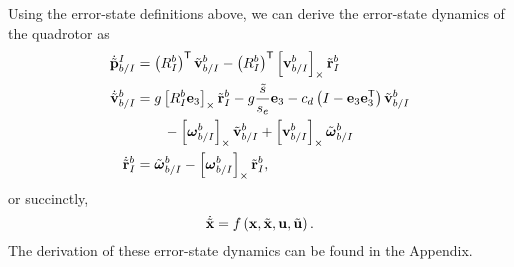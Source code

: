 Using the error-state definitions above, we can derive the error-state dynamics
of the quadrotor as
\begin{align}
        \dot{\tilde{\boldsymbol{\mathrm{p}}}}_{b/I}^{I} &= \left(R_{I}^{b}\right)^{\mathsf{T}}
          \tilde{\boldsymbol{\mathrm{v}}}_{b/I}^{b} - \left(R_{I}^{b}\right)^{\mathsf{T}}
          \left[ \boldsymbol{\mathrm{v}}_{b/I}^{b} \right]_{\times} \tilde{\boldsymbol{\mathrm{r}}}_I^b \nonumber\\
        \dot{\tilde{\boldsymbol{\mathrm{v}}}}_{b/I}^{b} &= g\left[ R_I^b
          \boldsymbol{\mathrm{e}}_3 \right]_{\times} \tilde{\boldsymbol{\mathrm{r}}}_I^b -g\frac{\tilde{s}}{s_e}\boldsymbol{\mathrm{e}}_3
          -c_d \left( I - \boldsymbol{\mathrm{e}}_3 \boldsymbol{\mathrm{e}}_3^{\mathsf{T}} \right)
          \tilde{\boldsymbol{\mathrm{v}}}_{b/I}^b \nonumber \\
                                         & \qquad - \left[ \boldsymbol{\mathrm{\omega}}_{b/I}^b \right]_{\times}
          \tilde{\boldsymbol{\mathrm{v}}}_{b/I}^b + \left[ \boldsymbol{\mathrm{v}}_{b/I}^b \right]_{\times}
          \tilde{\boldsymbol{\mathrm{\omega}}}_{b/I}^b \nonumber \\
          \dot{\tilde{\boldsymbol{\mathrm{r}}}}_{I}^{b} &= \tilde{\boldsymbol{\mathrm{\omega}}}_{b/I}^{b} -
        \left[ \boldsymbol{\mathrm{\omega}}_{b/I}^{b}  \right]_{\times} \tilde{\boldsymbol{\mathrm{r}}}_I^b,
	\label{eq:error_state_dynamics}
\end{align}
or succinctly,
\begin{equation}
  \dot{\tilde{\boldsymbol{\mathrm{x}}}} = f\left(\boldsymbol{\mathrm{x}}, \tilde{\boldsymbol{\mathrm{x}}}, \boldsymbol{\mathrm{u}}, \tilde{\boldsymbol{\mathrm{u}}}\right).
\end{equation}
The derivation of these error-state dynamics can be found in the Appendix.


